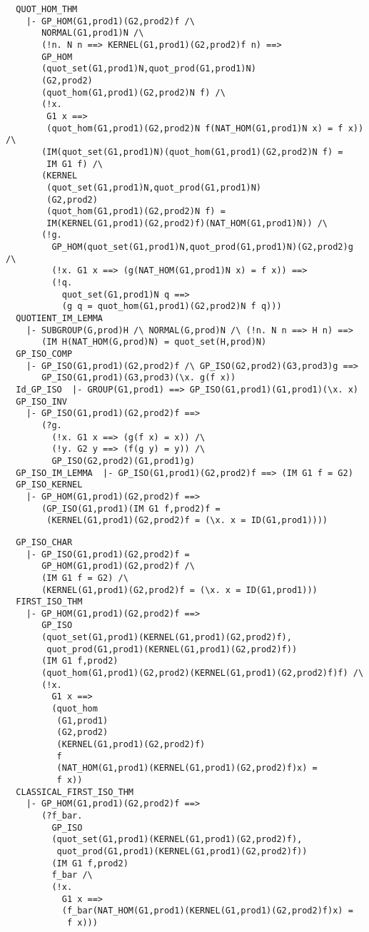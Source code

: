 \newpage
\begin{verbatim}
  QUOT_HOM_THM
    |- GP_HOM(G1,prod1)(G2,prod2)f /\
       NORMAL(G1,prod1)N /\
       (!n. N n ==> KERNEL(G1,prod1)(G2,prod2)f n) ==>
       GP_HOM
       (quot_set(G1,prod1)N,quot_prod(G1,prod1)N)
       (G2,prod2)
       (quot_hom(G1,prod1)(G2,prod2)N f) /\
       (!x.
        G1 x ==>
        (quot_hom(G1,prod1)(G2,prod2)N f(NAT_HOM(G1,prod1)N x) = f x)) /\
       (IM(quot_set(G1,prod1)N)(quot_hom(G1,prod1)(G2,prod2)N f) =
        IM G1 f) /\
       (KERNEL
        (quot_set(G1,prod1)N,quot_prod(G1,prod1)N)
        (G2,prod2)
        (quot_hom(G1,prod1)(G2,prod2)N f) =
        IM(KERNEL(G1,prod1)(G2,prod2)f)(NAT_HOM(G1,prod1)N)) /\
       (!g.
         GP_HOM(quot_set(G1,prod1)N,quot_prod(G1,prod1)N)(G2,prod2)g /\
         (!x. G1 x ==> (g(NAT_HOM(G1,prod1)N x) = f x)) ==>
         (!q.
           quot_set(G1,prod1)N q ==>
           (g q = quot_hom(G1,prod1)(G2,prod2)N f q)))
  QUOTIENT_IM_LEMMA
    |- SUBGROUP(G,prod)H /\ NORMAL(G,prod)N /\ (!n. N n ==> H n) ==>
       (IM H(NAT_HOM(G,prod)N) = quot_set(H,prod)N)
  GP_ISO_COMP
    |- GP_ISO(G1,prod1)(G2,prod2)f /\ GP_ISO(G2,prod2)(G3,prod3)g ==>
       GP_ISO(G1,prod1)(G3,prod3)(\x. g(f x))
  Id_GP_ISO  |- GROUP(G1,prod1) ==> GP_ISO(G1,prod1)(G1,prod1)(\x. x)
  GP_ISO_INV
    |- GP_ISO(G1,prod1)(G2,prod2)f ==>
       (?g.
         (!x. G1 x ==> (g(f x) = x)) /\
         (!y. G2 y ==> (f(g y) = y)) /\
         GP_ISO(G2,prod2)(G1,prod1)g)
  GP_ISO_IM_LEMMA  |- GP_ISO(G1,prod1)(G2,prod2)f ==> (IM G1 f = G2)
  GP_ISO_KERNEL
    |- GP_HOM(G1,prod1)(G2,prod2)f ==>
       (GP_ISO(G1,prod1)(IM G1 f,prod2)f =
        (KERNEL(G1,prod1)(G2,prod2)f = (\x. x = ID(G1,prod1))))
\end{verbatim}
\newpage
\begin{verbatim}
  GP_ISO_CHAR
    |- GP_ISO(G1,prod1)(G2,prod2)f =
       GP_HOM(G1,prod1)(G2,prod2)f /\
       (IM G1 f = G2) /\
       (KERNEL(G1,prod1)(G2,prod2)f = (\x. x = ID(G1,prod1)))
  FIRST_ISO_THM
    |- GP_HOM(G1,prod1)(G2,prod2)f ==>
       GP_ISO
       (quot_set(G1,prod1)(KERNEL(G1,prod1)(G2,prod2)f),
        quot_prod(G1,prod1)(KERNEL(G1,prod1)(G2,prod2)f))
       (IM G1 f,prod2)
       (quot_hom(G1,prod1)(G2,prod2)(KERNEL(G1,prod1)(G2,prod2)f)f) /\
       (!x.
         G1 x ==>
         (quot_hom
          (G1,prod1)
          (G2,prod2)
          (KERNEL(G1,prod1)(G2,prod2)f)
          f
          (NAT_HOM(G1,prod1)(KERNEL(G1,prod1)(G2,prod2)f)x) =
          f x))
  CLASSICAL_FIRST_ISO_THM
    |- GP_HOM(G1,prod1)(G2,prod2)f ==>
       (?f_bar.
         GP_ISO
         (quot_set(G1,prod1)(KERNEL(G1,prod1)(G2,prod2)f),
          quot_prod(G1,prod1)(KERNEL(G1,prod1)(G2,prod2)f))
         (IM G1 f,prod2)
         f_bar /\
         (!x.
           G1 x ==>
           (f_bar(NAT_HOM(G1,prod1)(KERNEL(G1,prod1)(G2,prod2)f)x) =
            f x)))
\end{verbatim}
